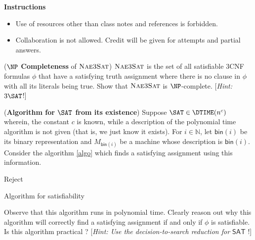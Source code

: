 \documentclass[12pt, a4paper,answers]{exam}
\begin{document}
\textbf{Instructions}
\begin{itemize}   \setlength\itemsep{0.1mm}
	\item {\sf  Use of resources other than class notes and references is forbidden.}
	\item {\sf Collaboration is not allowed. Credit will be given for attempts and partial answers.}
\end{itemize}


\begin{questions}


\question[10] (\textbf{$\NP$ Completeness} of $\textsc{Nae3Sat}$)
$\textsc{Nae3Sat}$ is the set of all satisfiable $3$CNF formulas $\phi$ that have a satisfying truth assignment where there is no clause in $\phi$ with all its literals being true. Show that $\textsc{Nae3Sat}$ is $\NP$-complete. [\textit{Hint: $3\SAT$}!]


\question[15] (\textbf{Algorithm for $\SAT$ from its existence})
Suppose $\SAT \in \DTIME(n^c)$ wherein, the constant $c$ is known, while a description of the polynomial time algorithm is not given (that is, we just know it exists). For $i \in \mathbb{N}$, let $\mathsf{bin}(i)$ be its binary representation and $M_{\mathsf{bin}(i)}$ be a machine whose description is $\mathsf{bin}(i)$. Consider the algorithm \ref{algo} which finds a satisfying assignment using this information.

\begin{algorithm}[htp!]
	Reject\;
	\label{algo}
	\caption{Algorithm for satisfiability}
\end{algorithm}

Observe that this algorithm runs in polynomial time. Clearly reason out why this algorithm will correctly find a satisfying assignment if and only if $\phi$ is satisfiable. Is this algorithm practical ? [\textit{Hint: Use the decision-to-search reduction for $\mathsf{SAT}$} !]




\end{questions}
\end{document}
